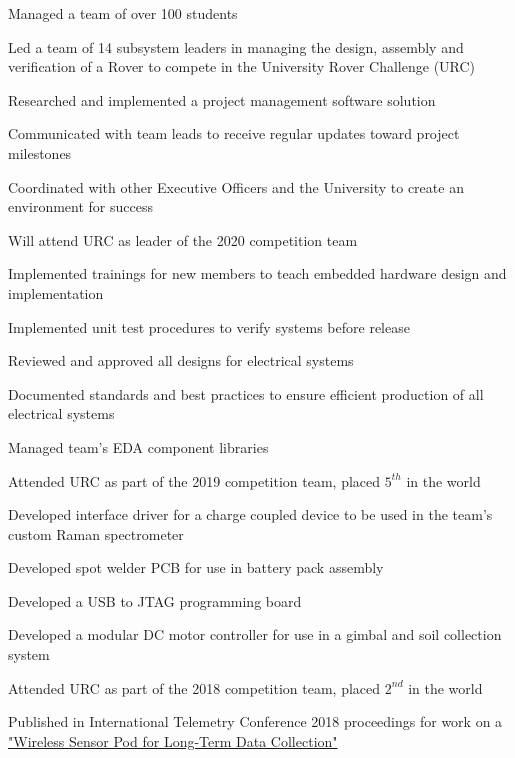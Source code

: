 \documentclass[]{deedy-resume-andrewvanhorn}
\begin{document}
\begin{minipage}[t]{0.66\textwidth}
\begin{tightemize}
	\item Managed a team of over 100 students
	\item Led a team of 14 subsystem leaders in managing the design, assembly and verification of a Rover to compete in the University Rover Challenge (URC)
	\item Researched and implemented a project management software solution
	\item Communicated with team leads to receive regular updates toward project milestones
	\item Coordinated with other Executive Officers and the University to create an environment for success
	\item Will attend URC as leader of the 2020 competition team
\end{tightemize}
\begin{tightemize}
	\item Implemented trainings for new members to teach embedded hardware design and implementation
	\item Implemented unit test procedures to verify systems before release
	\item Reviewed and approved all designs for electrical systems
	\item Documented standards and best practices to ensure efficient production of all electrical systems
	\item Managed team's EDA component libraries
	\item Attended URC as part of the 2019 competition team, placed $5^{th}$ in the world
\end{tightemize}
\begin{tightemize}
	\item Developed interface driver for a charge coupled device to be used in the team's custom Raman spectrometer
	\item Developed spot welder PCB for use in battery pack assembly
	\item Developed a USB to JTAG programming board
	\item Developed a modular DC motor controller for use in a gimbal and soil collection system
	\item Attended URC as part of the 2018 competition team, placed $2^{nd}$ in the world
	\item Published in International Telemetry Conference 2018 proceedings for work on a \href{https://repository.arizona.edu/handle/10150/631668}{"Wireless Sensor Pod for Long-Term Data Collection"}
\end{tightemize}
\sectionsep


\end{minipage}
\end{document}
